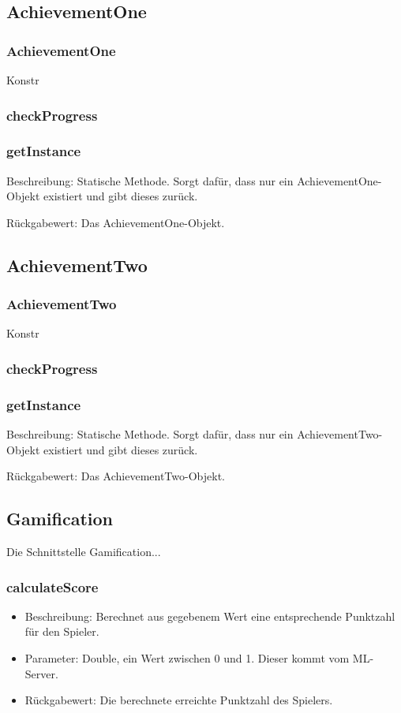 \documentclass[a4paper]{scrreprt}
\begin{document}
   \subsection{AchievementOne}
   \subsubsection{AchievementOne}
   Konstr
   \subsubsection{checkProgress}
   \subsubsection{getInstance}
   \item Beschreibung: Statische Methode. Sorgt dafür, dass nur ein AchievementOne-Objekt existiert und gibt dieses zurück.
   \item Rückgabewert: Das AchievementOne-Objekt.
   
   \subsection{AchievementTwo}
   \subsubsection{AchievementTwo}
   Konstr
   \subsubsection{checkProgress}
   \subsubsection{getInstance}
   \item Beschreibung: Statische Methode. Sorgt dafür, dass nur ein AchievementTwo-Objekt existiert und gibt dieses zurück.
   \item Rückgabewert: Das AchievementTwo-Objekt.
   
      
   \subsection{Gamification}
   Die Schnittstelle Gamification...
   \subsubsection{calculateScore}
    \begin{itemize}
   	\item Beschreibung: Berechnet aus gegebenem Wert eine entsprechende Punktzahl für den Spieler.
   	\item Parameter: Double, ein Wert zwischen 0 und 1. Dieser kommt vom ML-Server.
   	\item Rückgabewert: Die berechnete erreichte Punktzahl des Spielers.
   \end{itemize}
\end{document}
